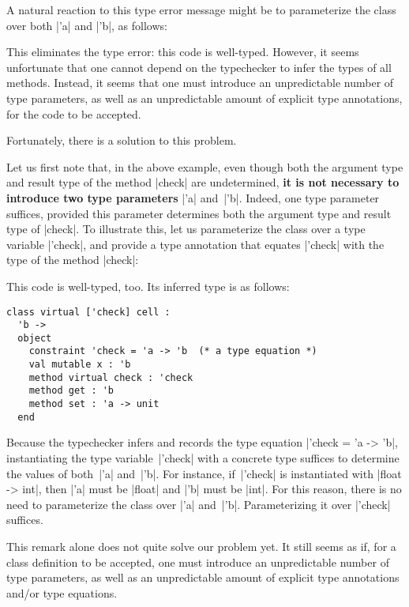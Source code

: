 \documentclass[11pt,a4paper,twoside]{article}
\renewcommand{\emph}[1]{\textbf{#1}}
\begin{document}
A natural reaction to this type error message might be to parameterize the
class over both \oc|'a| and \oc|'b|, as follows:
%

This eliminates the type error: this code is well-typed. However, it seems
unfortunate that one cannot depend on the typechecker to infer the types of
all methods. Instead, it seems that one must introduce an unpredictable number
of type parameters, as well as an unpredictable amount of explicit type
annotations, for the code to be accepted.

Fortunately, there is a solution to this problem.

Let us first note that, in the above example, even though both the argument
type and result type of the method \oc|check| are undetermined, \emph{it is
  not necessary to introduce two type parameters} \oc|'a| and~\oc|'b|. Indeed,
one type parameter suffices, provided this parameter determines both the
argument type and result type of \oc|check|. To illustrate this, let us
parameterize the class over a type variable \oc|'check|, and provide a type
annotation that equates \oc|'check| with the type of the method \oc|check|:
%

This code is well-typed, too. Its inferred type is as follows:
%
\begin{mdframed}[backgroundcolor=green!10]
\begin{lstlisting}
class virtual ['check] cell :
  'b ->
  object
    constraint 'check = 'a -> 'b  (* a type equation *)
    val mutable x : 'b
    method virtual check : 'check
    method get : 'b
    method set : 'a -> unit
  end
\end{lstlisting}
\end{mdframed}

Because the typechecker infers and records the type equation %
\oc|'check = 'a -> 'b|, instantiating the type variable~\oc|'check| with a
concrete type suffices to determine the values of both~\oc|'a| and~\oc|'b|.
For instance, if~\oc|'check| is instantiated with \oc|float -> int|, then
\oc|'a| must be \oc|float| and \oc|'b| must be \oc|int|. For this reason,
there is no need to parameterize the class over \oc|'a| and~\oc|'b|.
Parameterizing it over \oc|'check| suffices.

This remark alone does not quite solve our problem yet. It still seems as if,
for a class definition to be accepted, one must introduce an unpredictable
number of type parameters, as well as an unpredictable amount of explicit type
annotations and/or type equations.
\end{document}
